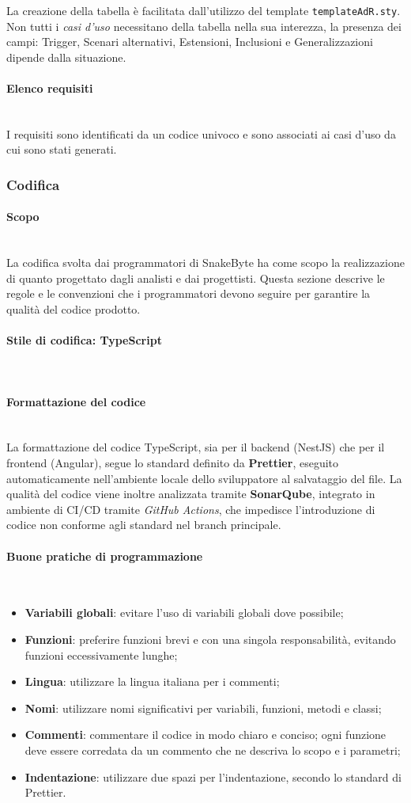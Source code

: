 \documentclass[10pt, letterpaper]{article}
\newcommand{\trisubsection}[1]{\paragraph{#1}\mbox{}\\}
\begin{document}
La creazione della tabella è facilitata dall'utilizzo del template \texttt{templateAdR.sty}.\\
Non tutti i \textit{casi d'uso} necessitano della tabella nella sua interezza, la presenza dei campi: Trigger, Scenari alternativi, Estensioni, Inclusioni e Generalizzazioni
dipende dalla situazione.



\trisubsection{{Elenco requisiti}}
I requisiti sono identificati da un codice univoco e sono associati ai casi d'uso da cui sono stati generati.

\subsubsection{Codifica}

\trisubsection{Scopo}
La codifica svolta dai programmatori di SnakeByte ha come scopo la realizzazione 
di quanto progettato dagli analisti e dai progettisti. Questa sezione descrive le 
regole e le convenzioni che i programmatori devono seguire per garantire la qualità 
del codice prodotto.

\trisubsection{Stile di codifica: TypeScript}

\trisubsection{Formattazione del codice}
La formattazione del codice TypeScript, sia per il backend (NestJS) che per il 
frontend (Angular), segue lo standard definito da \textbf{Prettier}, eseguito 
automaticamente nell'ambiente locale dello sviluppatore al salvataggio del file. 
La qualità del codice viene inoltre analizzata tramite \textbf{SonarQube}, 
integrato in ambiente di CI/CD tramite \textit{GitHub Actions}, che impedisce 
l'introduzione di codice non conforme agli standard nel branch principale.

\trisubsection{Buone pratiche di programmazione}
\begin{itemize}
    \item \textbf{Variabili globali}: evitare l'uso di variabili globali 
    dove possibile;
    \item \textbf{Funzioni}: preferire funzioni brevi e con una singola 
    responsabilità, evitando funzioni eccessivamente lunghe;
    \item \textbf{Lingua}: utilizzare la lingua italiana per i commenti;
    \item \textbf{Nomi}: utilizzare nomi significativi per variabili, 
    funzioni, metodi e classi;
    \item \textbf{Commenti}: commentare il codice in modo chiaro e conciso; 
    ogni funzione deve essere corredata da un commento che ne descriva 
    lo scopo e i parametri;
    \item \textbf{Indentazione}: utilizzare due spazi per l'indentazione, 
    secondo lo standard di Prettier.
\end{itemize}
\end{document}
